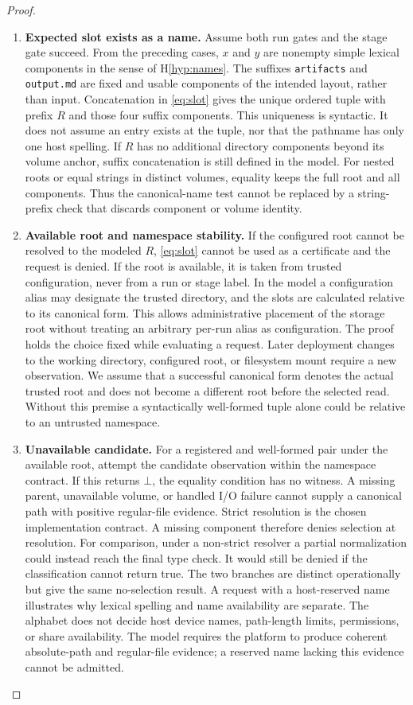 \documentclass[12pt]{article}
\newcommand{\denied}{\bot}
\begin{document}
\begin{proof}
\begin{enumerate}
\item \textbf{Expected slot exists as a name.}
Assume both run gates and the stage gate succeed. From the preceding
cases, $x$ and $y$ are nonempty simple lexical components in the
sense of H\ref{hyp:names}. The suffixes \texttt{artifacts} and
\texttt{output.md} are fixed and usable components of the intended
layout, rather than input. Concatenation in \eqref{eq:slot} gives
the unique ordered tuple with prefix $R$ and those four suffix
components. This uniqueness is syntactic. It does not assume an
entry exists at the tuple, nor that the pathname has only one host
spelling. If $R$ has no additional directory components beyond its
volume anchor, suffix concatenation is still defined in the model.
For nested roots or equal strings in distinct volumes, equality keeps
the full root and all components. Thus the canonical-name test cannot
be replaced by a string-prefix check that discards component or
volume identity.

\item \textbf{Available root and namespace stability.}
If the configured root cannot be resolved to the modeled $R$,
\eqref{eq:slot} cannot be used as a certificate and the request is
denied. If the root is available, it is taken from trusted
configuration, never from a run or stage label. In the model a
configuration alias may designate the trusted directory, and the
slots are calculated relative to its canonical form. This allows
administrative placement of the storage root without treating an
arbitrary per-run alias as configuration. The proof holds the choice
fixed while evaluating a request. Later deployment changes to the
working directory, configured root, or filesystem mount require a
new observation. We assume that a successful canonical form denotes
the actual trusted root and does not become a different root before
the selected read. Without this premise a syntactically well-formed
tuple alone could be relative to an untrusted namespace.

\item \textbf{Unavailable candidate.}
For a registered and well-formed pair under the available root,
attempt the candidate observation within the namespace contract.
If this returns $\denied$, the equality condition has no witness.
A missing parent, unavailable volume, or handled I/O failure cannot
supply a canonical path with positive regular-file evidence.
Strict resolution is the chosen implementation contract.
A missing component therefore denies selection at resolution.
For comparison, under a non-strict resolver a partial normalization
could instead reach the final type check. It would still be denied
if the classification cannot return true. The two branches are distinct operationally but
give the same no-selection result. A request with a host-reserved
name illustrates why lexical spelling and name availability are
separate. The alphabet does not decide host device names, path-length
limits, permissions, or share availability. The model requires the
platform to produce coherent absolute-path and regular-file evidence;
a reserved name lacking this evidence cannot be admitted.


\end{enumerate}
\end{proof}
\end{document}
